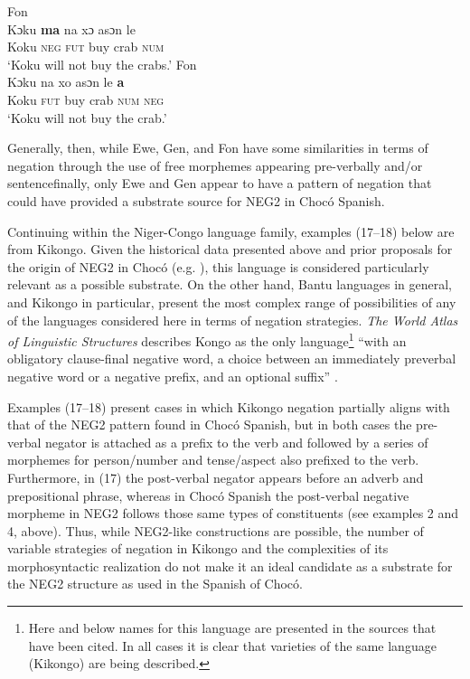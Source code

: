 \documentclass[output=paper,colorlinks,citecolor=brown]{langscibook}
\begin{document}
\ea Fon \citep[44]{Aboh_2004}\\
\gll Kɔku \textbf{ma} na xɔ asɔn le\\
     Koku \textsc{neg} \textsc{fut} buy crab \textsc{num}\\
\glt ‘Koku will not buy the crabs.’
\ex Fon \citep[45]{Aboh_2004}\\
\gll Kɔku na xo asɔn le \textbf{a}\\
     Koku \textsc{fut} buy crab \textsc{num} \textsc{neg}\\
\glt ‘Koku will not buy the crab.’
\z

Generally, then, while Ewe, Gen, and Fon have some similarities in terms of negation through the use of free morphemes appearing pre-verbally and/or sentencefinally, only Ewe and Gen appear to have a pattern of negation that could have provided a substrate source for NEG2 in Chocó Spanish.

Continuing within the Niger-Congo language family, examples (17–18) below are from Kikongo. Given the historical data presented above and prior proposals for the origin of NEG2 in Chocó (e.g. \cite{Schwegler_1991a,Schwegler_2018}), this language is considered particularly relevant as a possible substrate. On the other hand, Bantu languages in general, and Kikongo in particular, present the most complex range of possibilities of any of the languages considered here in terms of negation strategies. \emph{The World Atlas of Linguistic Structures} describes Kongo  as the only language\footnote{Here and below names for this language are presented in the sources that have been cited. In all cases it is clear that varieties of the same language (Kikongo) are being described.} “with an obligatory clause-final negative word, a choice between an immediately preverbal negative word or a negative prefix, and an optional suffix” \citep{Dryer_2013}.  

Examples (17–18) present cases in which Kikongo negation partially aligns with that of the NEG2 pattern found in Chocó Spanish, but in both cases the pre-verbal negator is attached as a prefix to the verb and followed by a series of morphemes for person/number and tense/aspect also prefixed to the verb. Furthermore, in (17) the post-verbal negator appears before an adverb and prepositional phrase, whereas in Chocó Spanish the post-verbal negative morpheme in NEG2 follows those same types of constituents (see examples 2 and 4, above). Thus, while NEG2-like constructions are possible, the number of variable strategies of negation in Kikongo and the complexities of its morphosyntactic realization do not make it an ideal candidate as a substrate for the NEG2 structure as used in the Spanish of Chocó.
\end{document}
